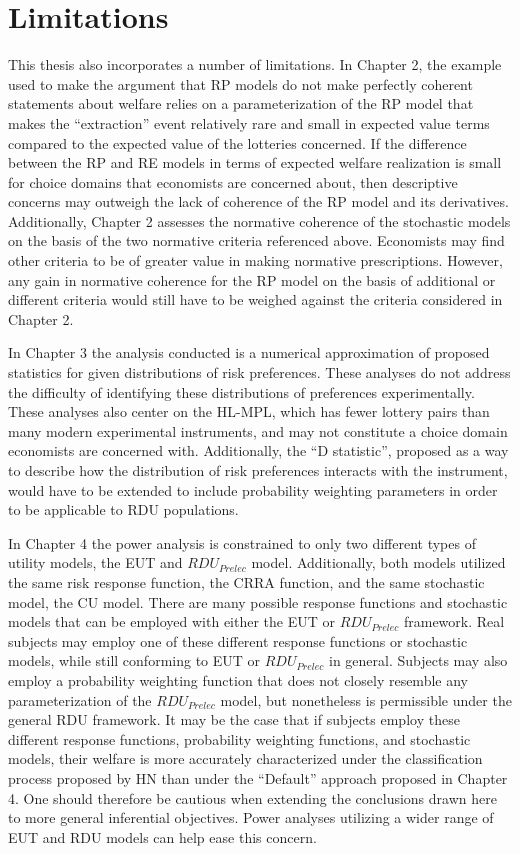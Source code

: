 \documentclass[../main.tex]{subfiles}
\begin{document}
\section{Limitations}
This thesis also incorporates a number of limitations.
In Chapter 2, the example used to make the argument that RP models do not make perfectly coherent statements about welfare relies on a parameterization of the RP model that makes the \enquote{extraction} event relatively rare and small in expected value terms compared to the expected value of the lotteries concerned.
If the difference between the RP and RE models in terms of expected welfare realization is small for choice domains that economists are concerned about, then descriptive concerns may outweigh the lack of coherence of the RP model and its derivatives.
Additionally, Chapter 2 assesses the normative coherence of the stochastic models on the basis of the two normative criteria referenced above.
Economists may find other criteria to be of greater value in making normative prescriptions.
However, any gain in normative coherence for the RP model on the basis of additional or different criteria would still have to be weighed against the criteria considered in Chapter 2.

In Chapter 3 the analysis conducted is a numerical approximation of proposed statistics for given distributions of risk preferences.
These analyses do not address the difficulty of identifying these distributions of preferences experimentally.
These analyses also center on the HL-MPL, which has fewer lottery pairs than many modern experimental instruments, and may not constitute a choice domain economists are concerned with.
Additionally, the \enquote{D statistic}, proposed as a way to describe how the distribution of risk preferences interacts with the instrument, would have to be extended to include probability weighting parameters in order to be applicable to RDU populations.

In Chapter 4 the power analysis is constrained to only two different types of utility models, the EUT and $\mathit{RDU_{Prelec}}$ model.
Additionally, both models utilized the same risk response function, the CRRA function, and the same stochastic model, the CU model.
There are many possible response functions and stochastic models that can be employed with either the EUT or $\mathit{RDU_{Prelec}}$ framework.
Real subjects may employ one of these different response functions or stochastic models, while still conforming to EUT or $\mathit{RDU_{Prelec}}$ in general.
Subjects may also employ a probability weighting function that does not closely resemble any parameterization of the $\mathit{RDU_{Prelec}}$ model, but nonetheless is permissible under the general RDU framework.
It may be the case that if subjects employ these different response functions, probability weighting functions, and stochastic models, their welfare is more accurately characterized under the classification process proposed by HN than under the \enquote{Default} approach proposed in Chapter 4.
One should therefore be cautious when extending the conclusions drawn here to more general inferential objectives.
Power analyses utilizing a wider range of EUT and RDU models can help ease this concern.
\end{document}
